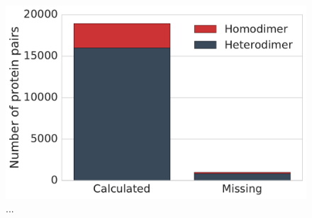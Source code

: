 \begin{figure}[!tb]
	\centering
	\includegraphics[width=0.4\linewidth]{static/elaspic_training_set/elaspic_statistics/missing_model_protein_pair_novarsplice.pdf}
	\caption[Precalculated data for human protein-protein interactions.]{...}
\end{figure}
